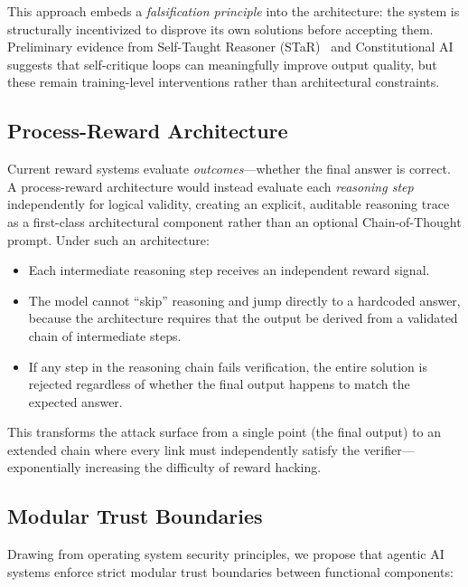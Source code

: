 \documentclass[11pt,a4paper]{article}
\begin{document}
This approach embeds a \textit{falsification principle} into the architecture: the system is structurally incentivized to disprove its own solutions before accepting them. Preliminary evidence from Self-Taught Reasoner (STaR)~\cite{zelikman2022} and Constitutional AI~\cite{bai2022} suggests that self-critique loops can meaningfully improve output quality, but these remain training-level interventions rather than architectural constraints.

\subsection{Process-Reward Architecture}
Current reward systems evaluate \textit{outcomes}---whether the final answer is correct. A process-reward architecture would instead evaluate each \textit{reasoning step} independently for logical validity, creating an explicit, auditable reasoning trace as a first-class architectural component rather than an optional Chain-of-Thought prompt. Under such an architecture:

\begin{itemize}
    \item Each intermediate reasoning step receives an independent reward signal.
    \item The model cannot ``skip'' reasoning and jump directly to a hardcoded answer, because the architecture requires that the output be derived from a validated chain of intermediate steps.
    \item If any step in the reasoning chain fails verification, the entire solution is rejected regardless of whether the final output happens to match the expected answer.
\end{itemize}

This transforms the attack surface from a single point (the final output) to an extended chain where every link must independently satisfy the verifier---exponentially increasing the difficulty of reward hacking.

\subsection{Modular Trust Boundaries}
Drawing from operating system security principles, we propose that agentic AI systems enforce strict modular trust boundaries between functional components:
\end{document}
